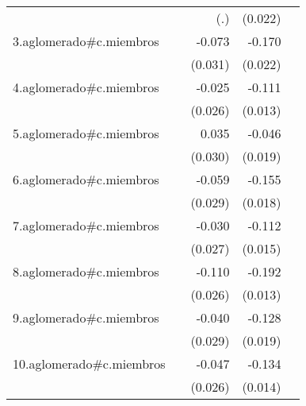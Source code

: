 {\begin{longtable}{l*{4}{D{.}{.}{-1}}}
            &                     &         (.)         &     (0.022)         &                     \\
\addlinespace
3.aglomerado#c.miembros&                     &      -0.073\sym{*}  &      -0.170\sym{***}&                     \\
            &                     &     (0.031)         &     (0.022)         &                     \\
\addlinespace
4.aglomerado#c.miembros&                     &      -0.025         &      -0.111\sym{***}&                     \\
            &                     &     (0.026)         &     (0.013)         &                     \\
\addlinespace
5.aglomerado#c.miembros&                     &       0.035         &      -0.046\sym{*}  &                     \\
            &                     &     (0.030)         &     (0.019)         &                     \\
\addlinespace
6.aglomerado#c.miembros&                     &      -0.059\sym{*}  &      -0.155\sym{***}&                     \\
            &                     &     (0.029)         &     (0.018)         &                     \\
\addlinespace
7.aglomerado#c.miembros&                     &      -0.030         &      -0.112\sym{***}&                     \\
            &                     &     (0.027)         &     (0.015)         &                     \\
\addlinespace
8.aglomerado#c.miembros&                     &      -0.110\sym{***}&      -0.192\sym{***}&                     \\
            &                     &     (0.026)         &     (0.013)         &                     \\
\addlinespace
9.aglomerado#c.miembros&                     &      -0.040         &      -0.128\sym{***}&                     \\
            &                     &     (0.029)         &     (0.019)         &                     \\
\addlinespace
10.aglomerado#c.miembros&                     &      -0.047         &      -0.134\sym{***}&                     \\
            &                     &     (0.026)         &     (0.014)         &                     \\

\end{longtable}}
